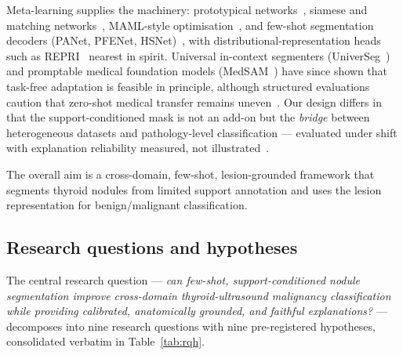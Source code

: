 \documentclass[jimh,article,submit,moreauthors,pdftex]{Definitions/tsp}
\begin{document}
Meta-learning supplies the machinery: prototypical
networks~\cite{rev_snell2017}, siamese and matching
networks~\cite{rev_koch2015,rev_vinyals2016}, MAML-style
optimisation~\cite{rev_finn2017}, and few-shot segmentation decoders
(PANet, PFENet, HSNet)~\cite{rev_wang2019panet,rev_tian2020pfenet,rev_min2021hsnet},
with distributional-representation heads such as REPRI~\cite{rev_boudiaf2021repri}
nearest in spirit. Universal in-context segmenters
(UniverSeg~\cite{rev_butoi2023universeg}) and promptable medical
foundation models (MedSAM~\cite{rev_ma2024medsam}) have since shown that
task-free adaptation is feasible in principle, although structured
evaluations caution that zero-shot medical transfer remains
uneven~\cite{rev_huang2024sammed}. Our design differs in that the
support-conditioned mask is not an add-on but the \emph{bridge} between
heterogeneous datasets and pathology-level classification --- evaluated
under shift with explanation reliability measured, not
illustrated~\cite{rev_selvaraju2017,rev_adebayo2018}.

The overall aim is a cross-domain, few-shot, lesion-grounded framework
that segments thyroid nodules from limited support annotation and uses
the lesion representation for benign/malignant classification.

\subsection{Research questions and hypotheses}\label{sec:research_questions}

The central research question --- \emph{can few-shot, support-conditioned
nodule segmentation improve cross-domain thyroid-ultrasound malignancy
classification while providing calibrated, anatomically grounded, and
faithful explanations?} --- decomposes into nine research questions with
nine pre-registered hypotheses, consolidated verbatim in
Table~\ref{tab:rqh}.
\end{document}
